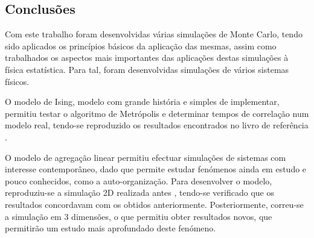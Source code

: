 \documentclass[a4paper,10pt]{article}
\begin{document}
\begin{multicols}{2}
\section{Conclusões}

Com este trabalho foram desenvolvidas várias simulações de Monte Carlo, tendo sido aplicados os princípios básicos da aplicação das mesmas, assim como trabalhados os aspectos mais importantes das aplicações destas simulações à física estatística. Para tal, foram desenvolvidas simulações de vários sistemas físicos.

O modelo de Ising, modelo com grande história e simples de implementar, permitiu testar o algoritmo de Metrópolis e determinar tempos de correlação num modelo real, tendo-se reproduzido os resultados encontrados no livro de referência \cite{barkema}.

O modelo de agregação linear permitiu efectuar simulações de sistemas com interesse contemporâneo, dado que permite estudar fenómenos ainda em estudo e pouco conhecidos, como a auto-organização. Para desenvolver o modelo, reproduziu-se a simulação 2D realizada antes \cite{tavares}, tendo-se verificado que os resultados concordavam com os obtidos anteriormente. Posteriormente, correu-se a simulação em 3 dimensões, o que permitiu obter resultados novos, que permitirão um estudo mais aprofundado deste fenómeno.

\end{multicols}

\pagebreak
\end{document}
